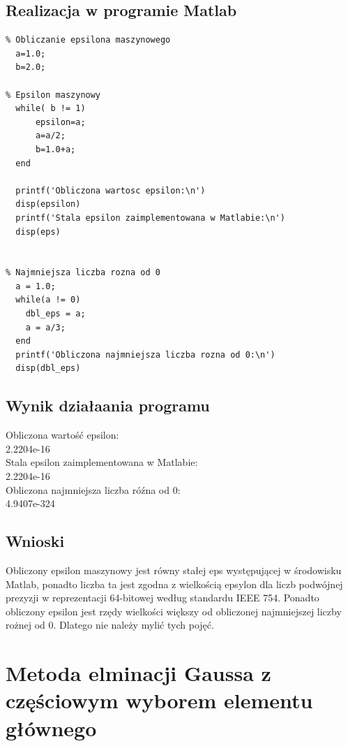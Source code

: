 \documentclass[a4paper, 11pt]{article}
\begin{document}
\subsection{Realizacja w programie Matlab}

\begin{lstlisting}
% Obliczanie epsilona maszynowego 
  a=1.0;
  b=2.0; 
 
% Epsilon maszynowy 
  while( b != 1)
      epsilon=a; 
      a=a/2; 
      b=1.0+a; 
  end
  
  printf('Obliczona wartosc epsilon:\n')
  disp(epsilon)
  printf('Stala epsilon zaimplementowana w Matlabie:\n')
  disp(eps)
  
  
% Najmniejsza liczba rozna od 0
  a = 1.0;
  while(a != 0)
    dbl_eps = a; 
    a = a/3; 
  end
  printf('Obliczona najmniejsza liczba rozna od 0:\n')
  disp(dbl_eps)

\end{lstlisting}

\vspace{1cm}

\subsection{Wynik działaania programu}

Obliczona wartość epsilon:\\
	2.2204e-16\\
Stala epsilon zaimplementowana w Matlabie:\\
	2.2204e-16\\
Obliczona najmniejsza liczba róźna od 0:\\
	4.9407e-324\\
	
\subsection{Wnioski}
\indent 

Obliczony epsilon maszynowy jest równy stałej eps występującej w środowisku Matlab, ponadto liczba ta jest zgodna z wielkością epsylon dla liczb podwójnej prezyzji w reprezentacji 64-bitowej według standardu IEEE 754. 
Ponadto obliczony epsilon jest rzędy wielkości większy od obliczonej najmniejszej liczby rożnej od 0. Dlatego nie należy mylić tych pojęć.~\cite{epsylon}


\section{Metoda elminacji Gaussa z częściowym wyborem elementu głównego}
\end{document}
